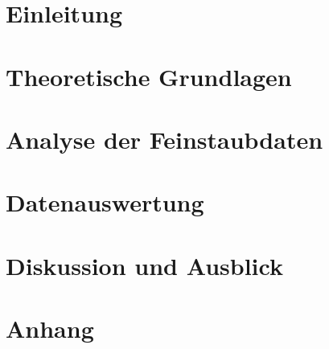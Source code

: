 \documentclass[12pt]{article}
\theoremstyle{definition}
\begin{document}
\tableofcontents
\newpage

    
\section{Einleitung}
\label{KapitelEinleitung}

\newpage

\section{Theoretische Grundlagen}
\label{KapitelTheorie}





\newpage

\section{Analyse der Feinstaubdaten}
\label{KapitelDatenanalyse}


\newpage

\section{Datenauswertung}
\label{KapitelDatenauswertung}




\newpage

\section{Diskussion und Ausblick}

\newpage

%

\setcounter{page}{51} %

\appendix
%
\section{Anhang}
\label{Appendix}

\newpage

\newpage
\end{document}
